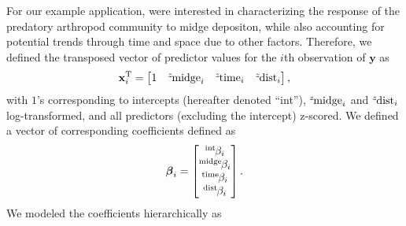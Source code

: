 For our example application,
were interested in characterizing the response of the predatory arthropod
community to midge depositon, while also accounting for potential trends through
time and space due to other factors.
Therefore, we defined the transposed vector of predictor values for the $i$th observation
of $\mathbf{y}$ as
%
\begin{equation} \label{eq:x-vec}
    \mathbf{x}_i^\text{T} = \begin{bmatrix}
        1 &
        {}^z\hspace*{-1pt}\text{midge}_i &
        {}^z\hspace*{-1pt}\text{time}_i &
        {}^z\hspace*{-1pt}\text{dist}_i
    \end{bmatrix}\text{,}
\end{equation}
%
\noindent with $1$'s corresponding to intercepts (hereafter denoted ``int''),
${}^z\hspace*{-1pt}\text{midge}_i$ and ${}^z\hspace*{-1pt}\text{dist}_i$ log-transformed,
and all predictors (excluding the intercept) z-scored.
We defined a vector of corresponding coefficients defined as
%
\begin{equation} \label{eq:beta-vec}
{\boldsymbol\beta}_i = \begin{bmatrix}
    {}^\text{int}\hspace*{-1pt}\beta_i \\
    {}^\text{midge}\hspace*{-1pt}\beta_i \\
    {}^\text{time}\hspace*{-1pt}\beta_i \\
    {}^\text{dist}\hspace*{-1pt}\beta_i
    \end{bmatrix}\text{.}
\end{equation}
%
\noindent We modeled the coefficients hierarchically \citep[following][]{Jackson2012} as
%
